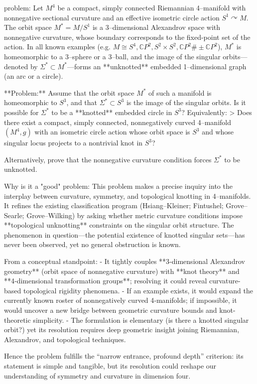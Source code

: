 problem:  
Let \( M^4 \) be a compact, simply connected Riemannian 4–manifold with nonnegative sectional curvature and an effective isometric circle action \( S^1 \curvearrowright M \). The orbit space \( M^* = M/S^1 \) is a 3–dimensional Alexandrov space with nonnegative curvature, whose boundary corresponds to the fixed-point set of the action. In all known examples (e.g. \(M \cong S^4, \mathbb{C}P^2, S^2 \times S^2, \mathbb{C}P^2 \# \pm \mathbb{C}P^2\)), \( M^* \) is homeomorphic to a 3–sphere or a 3–ball, and the image of the singular orbits—denoted by \(\Sigma^* \subset M^*\)—forms an **unknotted** embedded 1–dimensional graph (an arc or a circle).  

**Problem:**  
Assume that the orbit space \(M^*\) of such a manifold is homeomorphic to \(S^3\), and that \(\Sigma^*\subset S^3\) is the image of the singular orbits. Is it possible for \(\Sigma^*\) to be a **knotted** embedded circle in \(S^3\)?  
Equivalently:
> Does there exist a compact, simply connected, nonnegatively curved 4–manifold \( (M^4, g) \) with an isometric circle action whose orbit space is \(S^3\) and whose singular locus projects to a nontrivial knot in \(S^3\)?  

Alternatively, prove that the nonnegative curvature condition forces \(\Sigma^*\) to be unknotted.

Why is it a "good" problem:  
This problem makes a precise inquiry into the interplay between curvature, symmetry, and topological knotting in 4–manifolds. It refines the existing classification program (Hsiang–Kleiner; Fintushel; Grove–Searle; Grove–Wilking) by asking whether metric curvature conditions impose **topological unknotting** constraints on the singular orbit structure. The phenomenon in question—the potential existence of knotted singular sets—has never been observed, yet no general obstruction is known.  

From a conceptual standpoint:
- It tightly couples **3‑dimensional Alexandrov geometry** (orbit space of nonnegative curvature) with **knot theory** and **4‑dimensional transformation groups**; resolving it could reveal curvature-based topological rigidity phenomena.  
- If an example exists, it would expand the currently known roster of nonnegatively curved 4‑manifolds; if impossible, it would uncover a new bridge between geometric curvature bounds and knot-theoretic simplicity.  
- The formulation is elementary (is there a knotted singular orbit?) yet its resolution requires deep geometric insight joining Riemannian, Alexandrov, and topological techniques.  

Hence the problem fulfills the “narrow entrance, profound depth” criterion: its statement is simple and tangible, but its resolution could reshape our understanding of symmetry and curvature in dimension four.